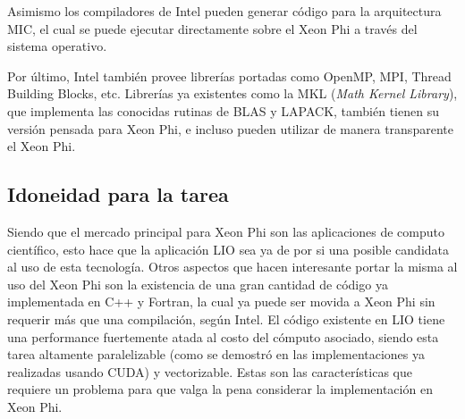 Asimismo los compiladores de Intel pueden generar c\'odigo para la arquitectura MIC, el cual se puede ejecutar directamente sobre
el Xeon Phi a trav\'es del sistema operativo.

Por \'ultimo, Intel tambi\'en provee librer\'ias portadas como OpenMP, MPI, Thread Building Blocks, etc. Librer\'ias ya existentes
como la MKL (\textit{Math Kernel Library}), que implementa las conocidas rutinas de BLAS y LAPACK, tambi\'en tienen su versi\'on
pensada para Xeon Phi, e incluso pueden utilizar de manera transparente el Xeon Phi.

\subsection{Idoneidad para la tarea}

Siendo que el mercado principal para Xeon Phi son las aplicaciones de computo cient\'ifico, esto hace que la
aplicaci\'on LIO sea ya de por si una posible candidata al uso de esta tecnolog\'ia. Otros aspectos que
hacen interesante portar la misma al uso del Xeon Phi son la existencia de una gran cantidad de c\'odigo ya
implementada en C++ y Fortran, la cual ya puede ser movida a Xeon Phi sin requerir m\'as que una compilaci\'on,
seg\'un Intel.
El c\'odigo existente en LIO tiene una performance fuertemente atada al costo del c\'omputo asociado,
siendo esta tarea altamente paralelizable (como se demostr\'o en las implementaciones ya realizadas usando CUDA) y
vectorizable. Estas son las caracter\'isticas que requiere un problema para que valga la pena considerar la
implementaci\'on en Xeon Phi.
